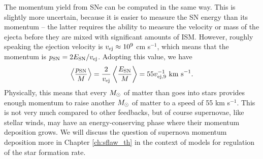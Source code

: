 The momentum yield from SNe can be computed in the same way. This is slightly more uncertain, because it is easier to measure the SN energy than its momentum -- the latter requires the ability to measure the velocity or mass of the ejecta before they are mixed with significant amounts of ISM. However, roughly speaking the ejection velocity is $v_{\rm ej} \approx 10^9$ cm s$^{-1}$, which means that the momentum is $p_{\rm SN} = 2 E_{\rm SN}/v_{\rm ej}$. Adopting this value, we have
\begin{equation}
\left\langle \frac{p_{\rm SN}}{M}\right\rangle = \frac{2}{v_{\rm ej}} \left\langle \frac{E_{\rm SN}}{M}\right\rangle = 55 v_{\rm ej,9}^{-1} \mbox{ km s}^{-1}.
\end{equation}
Physically, this means that every $M_{\odot}$ of matter than goes into stars provides enough momentum to raise another $M_{\odot}$ of matter to a speed of 55 km s$^{-1}$. This is not very much compared to other feedbacks, but of course supernovae, like stellar winds, may have an energy-conserving phase where their momentum deposition grows. We will discuss the question of supernova momentum deposition more in Chapter \ref{ch:sflaw_th} in the context of models for regulation of the star formation rate.